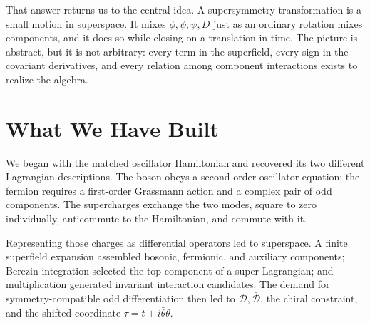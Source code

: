 \begin{classroomqa}
\end{classroomqa}

\begin{classroomqa}
\end{classroomqa}

That answer returns us to the central idea. A supersymmetry transformation is a small motion in superspace. It mixes \(\phi,\psi,\bar\psi,D\) just as an ordinary rotation mixes components, and it does so while closing on a translation in time. The picture is abstract, but it is not arbitrary: every term in the superfield, every sign in the covariant derivatives, and every relation among component interactions exists to realize the algebra.

\section{What We Have Built}

We began with the matched oscillator Hamiltonian and recovered its two different Lagrangian descriptions. The boson obeys a second-order oscillator equation; the fermion requires a first-order Grassmann action and a complex pair of odd components. The supercharges exchange the two modes, square to zero individually, anticommute to the Hamiltonian, and commute with it.

Representing those charges as differential operators led to superspace. A finite superfield expansion assembled bosonic, fermionic, and auxiliary components; Berezin integration selected the top component of a super-Lagrangian; and multiplication generated invariant interaction candidates. The demand for symmetry-compatible odd differentiation then led to \(\mathcal D,\bar{\mathcal D}\), the chiral constraint, and the shifted coordinate \(\tau=t+i\bar\theta\theta\).


